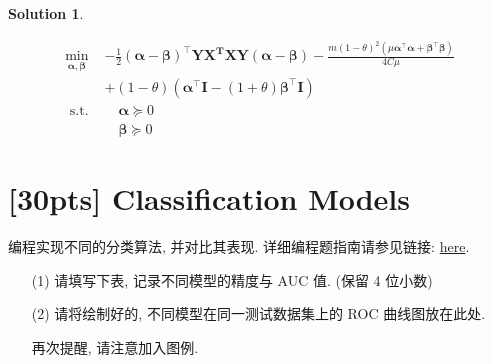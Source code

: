 \documentclass[a4paper,UTF8]{article}
\numberwithin{equation}{section}
\theoremstyle{definition}
\newtheorem*{solution}{Solution}
\begin{document}
\begin{solution}
\begin{enumerate}
        \begin{equation}
            \begin{aligned} \min \limits_{\boldsymbol{\alpha}, \boldsymbol{\beta}} &-\frac{1}{2}(\boldsymbol{\alpha}-\boldsymbol{\beta})^{\top} \boldsymbol{Y} \boldsymbol{X}^{\boldsymbol{T}} \boldsymbol{X} \boldsymbol{Y}(\boldsymbol{\alpha}-\boldsymbol{\beta})-\frac{m(1-\theta)^{2}\left(\mu \boldsymbol{\alpha}^{\top} \boldsymbol{\alpha}+\boldsymbol{\beta}^{\top} \boldsymbol{\beta}\right)}{4 C \mu} \\ & +(1-\theta)\left(\boldsymbol{\alpha}^{\top} \mathbf{I}-(1+\theta) \boldsymbol{\beta}^{\top} \mathbf{I}\right) \\ \text { s.t. } & \quad\boldsymbol{\alpha} \succeq 0 \\ & \quad \boldsymbol{\beta} \succeq 0\end{aligned}
        \end{equation}
    \end{enumerate}
\end{solution}

\newpage

\section{[30pts] Classification Models}
编程实现不同的分类算法, 并对比其表现. 详细编程题指南请参见链接: \href{https://www.lamda.nju.edu.cn/ML2023Spring/homework/hw3/hw3-code.html}{here}.
\begin{enumerate}
    \item[(1)] 请填写下表, 记录不同模型的精度与 AUC 值. (保留 4 位小数)
    \item[(2)] 请将绘制好的, 不同模型在同一测试数据集上的 ROC 曲线图放在此处. 
	
	再次提醒, 请注意加入图例.
\end{enumerate}
\end{document}
